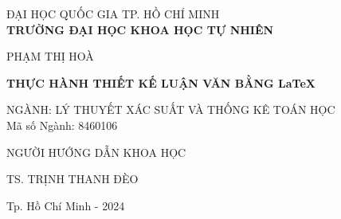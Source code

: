 \begin{titlepage}
\newpage
\thispagestyle{empty}
\begin{center}
\fontsize{13}{16}\selectfont
{ĐẠI HỌC QUỐC GIA TP. HỒ CHÍ MINH}\\
{\bf TRƯỜNG ĐẠI HỌC KHOA HỌC TỰ NHIÊN}

\vspace*{1.5cm}
\fontsize{14}{16}\selectfont
{PHẠM THỊ HOÀ}

\vspace*{1.5cm}
\fontsize{16}{16}\selectfont
{\bf THỰC HÀNH THIẾT KẾ LUẬN VĂN BẰNG \LaTeX}

\vspace*{1.5cm}
\fontsize{13}{16}\selectfont
NGÀNH: LÝ THUYẾT XÁC SUẤT VÀ THỐNG KÊ TOÁN HỌC\\[10pt]
Mã số Ngành: 8460106

\vspace*{3cm}

NGƯỜI HƯỚNG DẪN KHOA HỌC

{TS. TRỊNH THANH ĐÈO}

\vfill
\fontsize{13}{16}\selectfont
{Tp. Hồ Chí Minh - 2024}
\end{center}
\end{titlepage}
